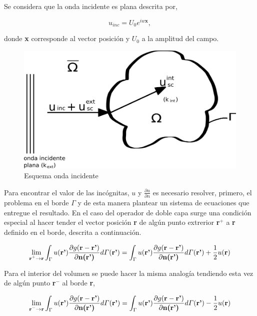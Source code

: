 \documentclass[12pt,letterpaper]{article}
\numberwithin{equation}{section}
\begin{document}
Se considera que la onda incidente es plana descrita por,

$$u_{inc}=U_0 e^{iw\textbf{x}},$$

donde \textbf{x} corresponde al vector posición y $U_0$ a la amplitud del campo.

\begin{figure}[H]
	\centering\includegraphics[scale=0.6]{Imagenes/esquema_uinc.png}
	\caption{Esquema onda incidente}
	\label{fig:esquema_u_inc}
\end{figure}

Para encontrar el valor de las incógnitas, $u$ y $\frac{\partial u}{\partial n}$ es necesario resolver, primero, el problema en el borde $\varGamma$ y de esta manera plantear un sistema de ecuaciones que entregue el resultado. En el caso del operador de doble capa surge una condición especial al hacer tender el vector posición \textbf{r} de algún punto extrerior \textbf{r$^+$} a \textbf{r} definido en el borde, descrita a continuación. 

$$\lim\limits_{\textbf{r$^+$}\rightarrow \textbf{r}}\int_{\Gamma}u(\textbf{r'})\frac{\partial g(\textbf{r}-\textbf{r'})}{\partial\textbf{n(\textbf{r'})}}d\varGamma(\textbf{r'})=\int_{\Gamma}u(\textbf{r'})\frac{\partial g(\textbf{r}-\textbf{r'})}{\partial\textbf{n(\textbf{r'})}}d\varGamma(\textbf{r'}) + \frac{1}{2}u(\textbf{r})$$

Para el interior del volumen se puede hacer la misma analogía tendiendo esta vez de algún punto \textbf{r$^-$} al borde \textbf{r},

$$\lim\limits_{\textbf{r$^-$}\rightarrow \textbf{r}}\int_{\Gamma}u(\textbf{r'})\frac{\partial g(\textbf{r}-\textbf{r'})}{\partial\textbf{n(\textbf{r'})}}d\varGamma(\textbf{r'})=\int_{\Gamma}u(\textbf{r'})\frac{\partial g(\textbf{r}-\textbf{r'})}{\partial\textbf{n(\textbf{r'})}}d\varGamma(\textbf{r'}) - \frac{1}{2}u(\textbf{r})$$
\end{document}
